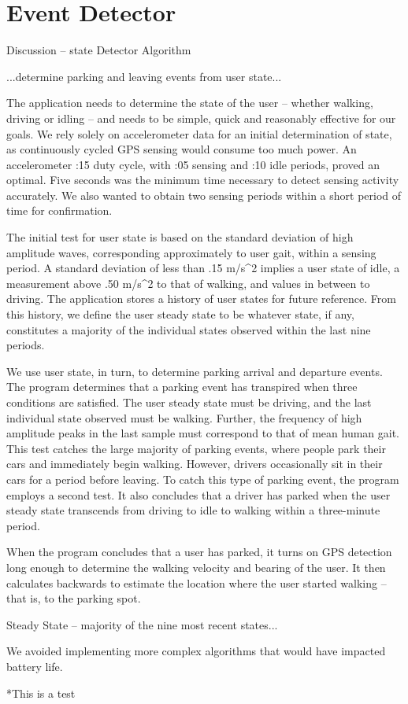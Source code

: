 \section{Event Detector}
\label{sec-detector}

Discussion -- state Detector Algorithm


...determine parking and leaving events from user state...

The application needs to determine the state of the user -- whether walking, driving or idling – and needs to be simple, quick and reasonably effective for our goals.  We rely solely on accelerometer data for an initial determination of state, as continuously cycled GPS sensing would consume too much power.  An accelerometer :15 duty cycle, with :05 sensing and :10 idle periods, proved an optimal.  Five seconds was  the minimum time necessary to detect sensing activity accurately.  We also wanted to obtain two sensing periods within a short period of time for confirmation.

The initial test for user state is based on the standard deviation of high amplitude waves, corresponding approximately to user gait, within a sensing period.  A standard deviation of less than .15 m/s^2 implies a user state of idle, a measurement above .50 m/s^2 to that of walking, and values in between to driving.  The application stores a history of user states for future reference.  From this history, we define the user steady state to be whatever state, if any, constitutes a majority of the individual states observed within the last nine periods.

We use user state, in turn, to determine parking arrival and departure events.  The program determines that a parking event has transpired when three conditions are satisfied.  The user steady state must be driving, and the last individual state observed must be walking.  Further, the frequency of high amplitude peaks in the last sample must correspond to that of mean human gait.  This test catches the large majority of parking events, where people park their cars and immediately begin walking.  However, drivers occasionally sit in their cars for a period before leaving.  To catch this type of parking event, the program employs a second test.  It also concludes that a driver has parked when the user steady state transcends from driving to idle to walking within a three-minute period.

When the program concludes that a user has parked, it turns on GPS detection long enough to determine the walking velocity and bearing of the user.  It then calculates backwards to estimate the location where the user started walking – that is, to the parking spot.

Steady State – majority of the nine most recent states...

We avoided implementing more complex algorithms that would have impacted battery life.

*This is a test  


